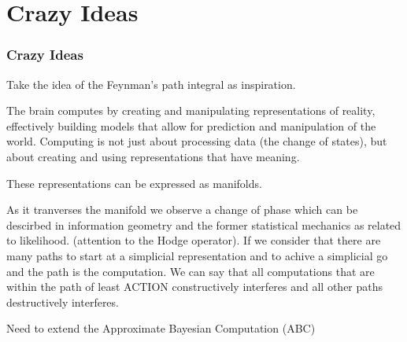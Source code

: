 \documentclass{beamer}
\begin{document}
\section{Crazy Ideas}
\begin{frame}
\frametitle{Crazy Ideas}

Take the idea of the Feynman's path integral as inspiration.

The brain computes by creating and manipulating representations of reality, effectively building models that allow for prediction and manipulation of the world. Computing is not just about processing data (the change of states), but about creating and using representations that have meaning.

These representations can be expressed as manifolds. 

As it tranverses the manifold we observe a change of phase which can be descirbed in information geometry and the former statistical mechanics as related to likelihood. (attention to the Hodge operator). If we consider that there are many paths to start at a simplicial representation and to achive a simplicial go and the path is the computation. We can say that all computations that are within the path of least ACTION constructively interferes and all other paths destructively interferes.

Need to extend the Approximate Bayesian Computation (ABC) 


\end{frame}

\end{document}
